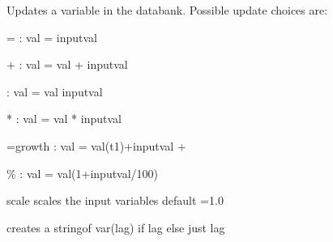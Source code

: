 \documentclass[letterpaper,10pt,english]{sphinxmanual}
\begin{document}
\begin{fulllineitems}
\label{\detokenize{unsorted/modelhelp:modelhelp.update_var}}
\pysigstartsignatures
{}
\pysigstopsignatures
\sphinxAtStartPar
Updates a variable in the databank. Possible update choices are:

\sphinxAtStartPar
= : val = inputval

\sphinxAtStartPar
+ : val = val + inputval

\sphinxAtStartPar
\sphinxhyphen{} : val = val \sphinxhyphen{} inputval

\sphinxAtStartPar
* : val = val * inputval

\sphinxAtStartPar
=growth  : val = val(t\sphinxhyphen{}1)+inputval +

\sphinxAtStartPar
\% : val = val(1+inputval/100)

\sphinxAtStartPar
scale scales the input variables default =1.0

\end{fulllineitems}


\begin{fulllineitems}
\label{\detokenize{unsorted/modelhelp:modelhelp.tovarlag}}
\pysigstartsignatures
{}
\pysigstopsignatures
\sphinxAtStartPar
creates a stringof var(lag) if lag else just lag

\end{fulllineitems}

\end{document}
